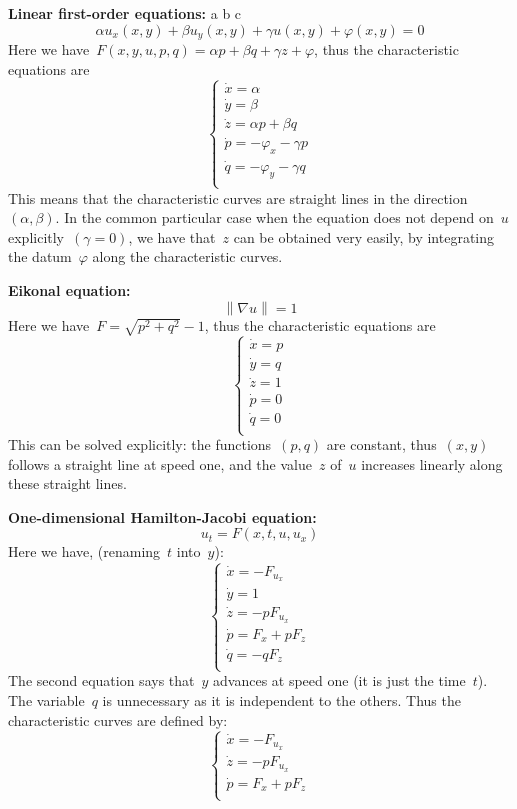 {\bf Linear first-order equations:}
a b c
\[
	\alpha u_x(x,y)+\beta u_y(x,y)+\gamma u(x,y)+\varphi(x,y)=0
\]
Here we have~$F(x,y,u,p,q)=\alpha p+\beta q+\gamma z+ \varphi$, thus the
characteristic equations are
\[
	\begin{cases}
		\dot x = \alpha \\
		\dot y = \beta \\
		\dot z = \alpha p + \beta q \\
		\dot p = -\varphi_x - \gamma p \\
		\dot q = -\varphi_y - \gamma q \\
	\end{cases}
\]
This means that the characteristic curves are straight lines in the
direction~$(\alpha,\beta)$.  In the common particular case when the equation
does not depend on~$u$ explicitly~$(\gamma=0)$, we have that~$z$ can be
obtained very easily, by integrating the datum~$\varphi$ along the
characteristic curves.

{\bf Eikonal equation:}
\[
	\left\|\nabla u\right\|=1
\]
Here we have~$F=\sqrt{p^2+q^2}-1$, thus the characteristic equations are
\[
	\begin{cases}
		\dot x = p\\ %
		\dot y = q\\ %
		\dot z = 1\\ %
		\dot p = 0 \\
		\dot q = 0 \\
	\end{cases}
\]
This can be solved explicitly: the functions~$(p,q)$ are constant,
thus~$(x,y)$ follows a straight line at speed one, and the value~$z$ of~$u$
increases linearly along these straight lines.

{\bf One-dimensional Hamilton-Jacobi equation:}
\[
	u_t=F(x,t,u,u_x)
\]
Here we have, (renaming~$t$ into~$y$):
\[
	\begin{cases}
		\dot x = -F_{u_x} \\
		\dot y = 1 \\
		\dot z = -pF_{u_x} \\
		\dot p = F_x+pF_z \\
		\dot q = -qF_z \\
	\end{cases}
\]
The second equation says that~$y$ advances at speed one (it is just the
time~$t$).  The variable~$q$ is unnecessary as it is independent to the
others.  Thus the characteristic curves are defined by:
\[
	\begin{cases}
		\dot x = -F_{u_x} \\
		\dot z = -pF_{u_x} \\
		\dot p = F_x+pF_z \\
	\end{cases}
\]

